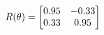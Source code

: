 \documentclass[preview]{standalone}
\begin{document}
\begin{align*}
\special{dvisvgm:raw <g id='unique000'>}R(\theta) = \begin{bmatrix}0.95 & -0.33\\0.33 & 0.95\end{bmatrix}\special{dvisvgm:raw </g>}
\end{align*}
\end{document}
